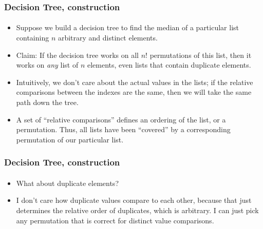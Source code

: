 \documentclass{beamer}                             %
\begin{document}
\begin{frame}
\frametitle{Decision Tree, construction}
\framesubtitle{}
\begin{itemize}[<+->]
  \item Suppose we build a decision tree to find the median of a
    particular list containing \( n \) arbitrary and distinct elements.
  \item Claim: If the decision tree works on all \( n! \)
    permutations of this list, then it works on \emph{any} list of
    \( n \) elements, even lists that contain duplicate elements.
  \item Intuitively, we don't care about the actual values in
    the lists; if the relative comparisons between the indexes are
    the same, then we will take the same path down the tree.
  \item A set of \enquote{relative comparisons} defines an ordering
    of the list, or a permutation. Thus, all lists have been \enquote{covered}
    by a corresponding permutation of our particular list.
\end{itemize}
\end{frame}

\begin{frame}
\frametitle{Decision Tree, construction}
\framesubtitle{}
\begin{itemize}
  \item What about duplicate elements?
  \item I don't care how duplicate values compare to each other, because that
    just determines the relative order of duplicates, which is arbitrary. I can
    just pick any permutation that is correct for distinct value comparisons.
\end{itemize}
\end{frame}
\end{document}
